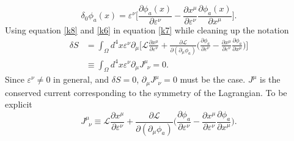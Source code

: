 \begin{equation}
	\delta_0\phi_a(x)=\varepsilon^\nu\bigg[\frac{\partial \phi_a(x)}{\partial \varepsilon^\nu}-\frac{\partial x^\mu}{\partial \varepsilon^\nu} \frac{\partial \phi_a(x)}{\partial x^\mu}\bigg].
	\label{k8}
\end{equation} 
Using equation \eqref{k8} and \eqref{k6} in equation \eqref{k7} while cleaning up the notation
\begin{equation}
	\begin{split}
		\delta S&=\int_{\Omega}d^4x \varepsilon^\nu\partial_\mu\bigg[\mathcal{L}\frac{\partial x^\mu}{\partial \varepsilon^\nu}+\frac{\partial \mathcal{L}}{\partial (\partial_\mu \phi_a)}\bigg(\frac{\partial \phi_a}{\partial \varepsilon^\nu}-\frac{\partial x^\mu}{\partial \varepsilon^\nu} \frac{\partial \phi_a}{\partial x^\mu}\bigg)\bigg]\\
		&\equiv\int_{\Omega}d^4x \varepsilon^\nu\partial_\mu J^\mu_{\,\,\,\nu}=0.
	\end{split}
	\label{k9}
\end{equation} 
Since $\varepsilon^\nu \neq 0$ in general, and $\delta S=0$, $\partial_\mu J^\mu_{\,\,\,\nu}=0$ must be the case. $J^\mu$ is the conserved current corresponding to the symmetry of the Lagrangian. To be explicit
\begin{equation}
	J^\mu_{\,\,\,\nu}\equiv\mathcal{L}\frac{\partial x^\mu}{\partial \varepsilon^\nu}+\frac{\partial \mathcal{L}}{\partial (\partial_\mu \phi_a)}\bigg(\frac{\partial \phi_a}{\partial \varepsilon^\nu}-\frac{\partial x^\mu}{\partial \varepsilon^\nu} \frac{\partial \phi_a}{\partial x^\mu}\bigg).
\end{equation} 

